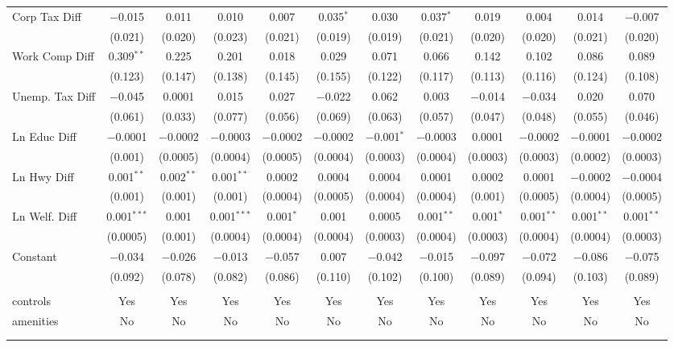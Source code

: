 \begin{table}[!htbp]
\begin{tabular}{@{\extracolsep{5pt}}lccccccccccc}
  Corp Tax Diff & $-$0.015 & 0.011 & 0.010 & 0.007 & 0.035$^{*}$ & 0.030 & 0.037$^{*}$ & 0.019 & 0.004 & 0.014 & $-$0.007 \\ 
  & (0.021) & (0.020) & (0.023) & (0.021) & (0.019) & (0.019) & (0.021) & (0.020) & (0.020) & (0.021) & (0.020) \\ 
  Work Comp Diff & 0.309$^{**}$ & 0.225 & 0.201 & 0.018 & 0.029 & 0.071 & 0.066 & 0.142 & 0.102 & 0.086 & 0.089 \\ 
  & (0.123) & (0.147) & (0.138) & (0.145) & (0.155) & (0.122) & (0.117) & (0.113) & (0.116) & (0.124) & (0.108) \\ 
  Unemp. Tax Diff & $-$0.045 & 0.0001 & 0.015 & 0.027 & $-$0.022 & 0.062 & 0.003 & $-$0.014 & $-$0.034 & 0.020 & 0.070 \\ 
  & (0.061) & (0.033) & (0.077) & (0.056) & (0.069) & (0.063) & (0.057) & (0.047) & (0.048) & (0.055) & (0.046) \\ 
  Ln Educ Diff & $-$0.0001 & $-$0.0002 & $-$0.0003 & $-$0.0002 & $-$0.0002 & $-$0.001$^{*}$ & $-$0.0003 & 0.0001 & $-$0.0002 & $-$0.0001 & $-$0.0002 \\ 
  & (0.001) & (0.0005) & (0.0004) & (0.0005) & (0.0004) & (0.0003) & (0.0004) & (0.0003) & (0.0003) & (0.0002) & (0.0003) \\ 
  Ln Hwy Diff & 0.001$^{**}$ & 0.002$^{**}$ & 0.001$^{**}$ & 0.0002 & 0.0004 & 0.0004 & 0.0001 & 0.0002 & 0.0001 & $-$0.0002 & $-$0.0004 \\ 
  & (0.001) & (0.001) & (0.001) & (0.0004) & (0.0005) & (0.0004) & (0.0004) & (0.001) & (0.0005) & (0.0004) & (0.0005) \\ 
  Ln Welf. Diff & 0.001$^{***}$ & 0.001 & 0.001$^{***}$ & 0.001$^{*}$ & 0.001 & 0.0005 & 0.001$^{**}$ & 0.001$^{*}$ & 0.001$^{**}$ & 0.001$^{**}$ & 0.001$^{**}$ \\ 
  & (0.0005) & (0.001) & (0.0004) & (0.0004) & (0.0004) & (0.0003) & (0.0004) & (0.0003) & (0.0004) & (0.0004) & (0.0003) \\ 
  Constant & $-$0.034 & $-$0.026 & $-$0.013 & $-$0.057 & 0.007 & $-$0.042 & $-$0.015 & $-$0.097 & $-$0.072 & $-$0.086 & $-$0.075 \\ 
  & (0.092) & (0.078) & (0.082) & (0.086) & (0.110) & (0.102) & (0.100) & (0.089) & (0.094) & (0.103) & (0.089) \\ 
 \hline \\[-1.8ex] 
controls & Yes & Yes & Yes & Yes & Yes & Yes & Yes & Yes & Yes & Yes & Yes \\ 
amenities & No & No & No & No & No & No & No & No & No & No & No \\ 
\hline \\[-1.8ex] 
\hline 
\hline \\[-1.8ex] 
\end{tabular} 
\end{table} 
